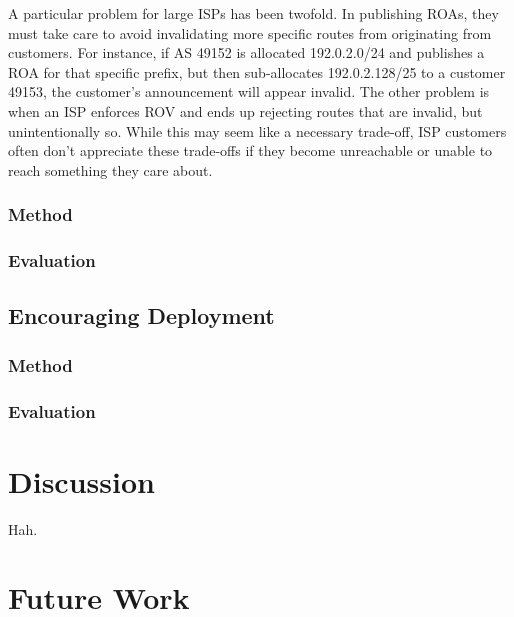 \documentclass[sigconf]{acmart}
\begin{document}
A particular problem for large ISPs has been twofold.  In publishing
ROAs, they must take care to avoid invalidating more specific routes
from originating from customers.  For instance, if AS 49152 is allocated
192.0.2.0/24 and publishes a ROA for that specific prefix, but then
sub-allocates 192.0.2.128/25 to a customer 49153, the customer's
announcement will appear invalid.  The other problem is when an ISP
enforces ROV and ends up rejecting routes that are invalid, but
unintentionally so.  While this may seem like a necessary trade-off,
ISP customers often don't appreciate these trade-offs if they become
unreachable or unable to reach something they care about.

\subsubsection{Method}
\subsubsection{Evaluation}

\subsection{Encouraging Deployment}
\subsubsection{Method}
\subsubsection{Evaluation}

\section{Discussion}\label{sec:Discussion}

Hah.

\section{Future Work}\label{sec:Future Work}
\end{document}
